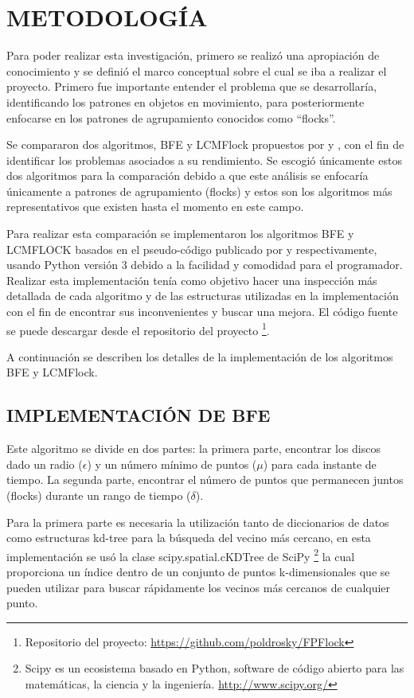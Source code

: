  
\chapter{METODOLOGÍA}

Para poder realizar esta investigación, primero se realizó una apropiación de 
conocimiento y se definió el marco conceptual sobre el cual se iba a realizar el proyecto. Primero fue importante 
entender el problema que se desarrollaría, identificando los patrones en objetos en movimiento, 
para posteriormente enfocarse en los patrones de agrupamiento conocidos como ``flocks''.

Se compararon dos algoritmos, BFE y LCMFlock propuestos por \cite{VieiraT13} y \cite{turdu2014}, con el fin de
identificar los problemas asociados a su rendimiento. Se escogió únicamente estos dos algoritmos 
para la comparación debido a que este análisis se enfocaría únicamente a patrones de agrupamiento 
(flocks) y estos son los algoritmos más representativos que existen hasta
el momento en este campo. 

Para realizar esta comparación se implementaron los algoritmos BFE y LCMFLOCK basados en el 
pseudo-código publicado por \cite{vieira2009line}  y \cite{romero2011mining} respectivamente,
usando Python versión 3 debido a la facilidad y comodidad para el programador. 
Realizar esta implementación tenía como objetivo hacer una inspección más detallada de cada 
algoritmo y de las estructuras utilizadas en la implementación con el fin de encontrar
sus inconvenientes y buscar una mejora. El código fuente se  puede descargar
desde el repositorio del proyecto \footnote{Repositorio del proyecto: 
\url{https://github.com/poldrosky/FPFlock}}.

A continuación se describen los detalles de la implementación de los algoritmos BFE y LCMFlock.

\section{IMPLEMENTACIÓN DE BFE}

Este algoritmo se divide en dos partes: la primera parte, encontrar los discos 
dado un radio ($\epsilon$) y un número mínimo de puntos ($\mu$) para cada instante de tiempo. La 
segunda parte, encontrar
el número de puntos que permanecen juntos (flocks) durante un rango de tiempo ($\delta$).

Para la primera parte es necesaria la utilización tanto de diccionarios de datos como
estructuras kd-tree para la búsqueda del vecino más cercano, en esta implementación se usó la clase 
scipy.spatial.cKDTree de
SciPy \footnote{Scipy es un ecosistema basado en Python, software de código abierto para las 
matemáticas, la ciencia y la ingeniería.
\url{http://www.scipy.org/}} la cual proporciona  un índice dentro de un conjunto de puntos 
k-dimensionales que se pueden utilizar
para buscar rápidamente los vecinos más cercanos de cualquier punto. 

